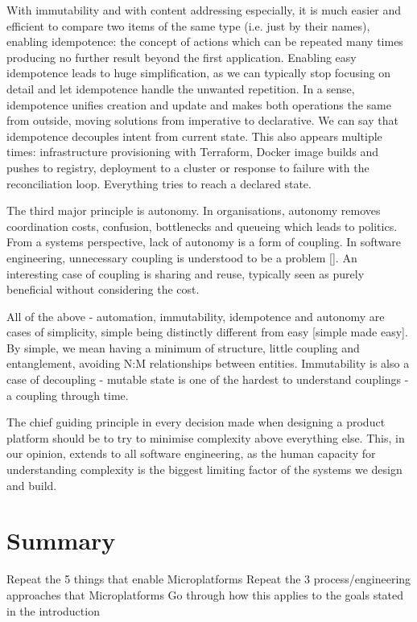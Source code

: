 \documentclass[reprint,amsmath,amssymb,aps]{revtex4-1}
\begin{document}
With immutability and with content addressing especially, it is much easier and efficient to compare two items of the same type (i.e. just by their names), enabling idempotence: the concept of actions which can be repeated many times producing no further result beyond the first application. Enabling easy idempotence leads to huge simplification, as we can typically stop focusing on detail and let idempotence handle the unwanted repetition. In a sense, idempotence unifies creation and update and makes both operations the same from outside, moving solutions from imperative to declarative. We can say that idempotence decouples intent from current state. This also appears multiple times: infrastructure provisioning with Terraform, Docker image builds and pushes to registry, deployment to a cluster or response to failure with the reconciliation loop. Everything tries to reach a declared state.

The third major principle is autonomy. In organisations, autonomy removes coordination costs, confusion, bottlenecks and queueing which leads to politics. From a systems perspective, lack of autonomy is a form of coupling. In software engineering, unnecessary coupling is understood to be a problem []. An interesting case of coupling is sharing and reuse, typically seen as purely beneficial without considering the cost. 

All of the above - automation, immutability, idempotence and autonomy are cases of simplicity, simple being distinctly different from easy [simple made easy]. By simple, we mean having a minimum of structure, little coupling and entanglement, avoiding N:M relationships between entities. Immutability is also a case of decoupling - mutable state is one of the hardest to understand couplings - a coupling through time.

The chief guiding principle in every decision made when designing a product platform should be to try to minimise complexity above everything else. This, in our opinion, extends to all software engineering, as the human capacity for understanding complexity is the biggest limiting factor of the systems we design and build.

\section{\label{sec:summary}Summary}

Repeat the 5 things that enable Microplatforms
Repeat the 3 process/engineering approaches that Microplatforms 
Go through how this applies to the goals stated in the introduction
\end{document}
